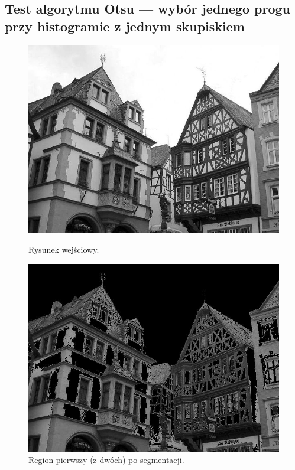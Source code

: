 \documentclass[10pt]{llncs}
\begin{document}
\subsection{Test algorytmu Otsu --- wybór jednego progu przy histogramie z jednym skupiskiem}

\begin{figure}[!htb]
  \includegraphics[width=\linewidth]{img/04.jpg}
  \caption{Rysunek wejściowy.}\label{fig:111}
\endminipage\hfill
{}
  \includegraphics[width=\linewidth]{img/04_region_01.jpg}
  \caption{Region pierwszy (z dwóch) po segmentacji.}\label{fig:211}
\endminipage\hfill
{}

\end{figure}
\end{document}
